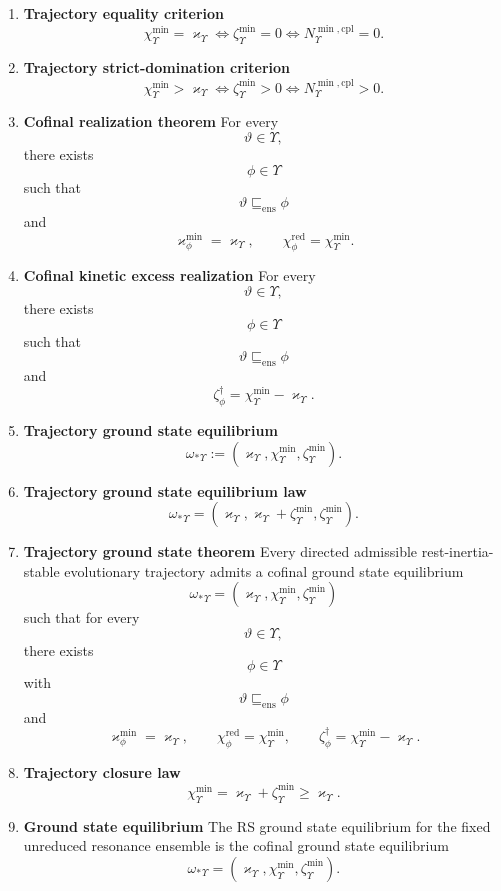 \documentclass[11pt,letterpaper]{article}
\theoremstyle{plain}
\theoremstyle{definition}
\theoremstyle{remark}
\newcommand{\RestInertia}{\varkappa}
\newcommand{\TotInertia}{\chi}
\newcommand{\AccAction}{\zeta}
\newcommand{\ResEnsAlt}{\vartheta}
\newcommand{\EvolTraj}{\Upsilon}
\newcommand{\GroundEq}{{\omega_{\ast}}}
\begin{document}
\begin{enumerate}[resume]
\item \textbf{Trajectory equality criterion}
\[
\TotInertia_{\EvolTraj}^{\min}=\RestInertia_{\EvolTraj}
\iff
\AccAction_{\EvolTraj}^{\min}=0
\iff
N_{\EvolTraj}^{\min, \mathrm{cpl}}=0.
\]

\item \textbf{Trajectory strict-domination criterion}
\[
\TotInertia_{\EvolTraj}^{\min}>\RestInertia_{\EvolTraj}
\iff
\AccAction_{\EvolTraj}^{\min}>0
\iff
N_{\EvolTraj}^{\min, \mathrm{cpl}}>0.
\]

\item \textbf{Cofinal realization theorem}
For every
\[
\ResEnsAlt\in\EvolTraj,
\]
there exists
\[
\phi\in\EvolTraj
\]
such that
\[
\ResEnsAlt\sqsubseteq_{\mathrm{ens}}\phi
\]
and
\[
\RestInertia_{\phi}^{\min}=\RestInertia_{\EvolTraj},
\qquad
\TotInertia_{\phi}^{\mathrm{red}}=\TotInertia_{\EvolTraj}^{\min}.
\]

\item \textbf{Cofinal kinetic excess realization}
For every
\[
\ResEnsAlt\in\EvolTraj,
\]
there exists
\[
\phi\in\EvolTraj
\]
such that
\[
\ResEnsAlt\sqsubseteq_{\mathrm{ens}}\phi
\]
and
\[
\AccAction_{\phi}^{\dagger}
=
\TotInertia_{\EvolTraj}^{\min}-\RestInertia_{\EvolTraj}.
\]

\item \textbf{Trajectory ground state equilibrium}
\[
\GroundEq_{\EvolTraj}
:=
(\RestInertia_{\EvolTraj},\TotInertia_{\EvolTraj}^{\min},\AccAction_{\EvolTraj}^{\min}).
\]

\item \textbf{Trajectory ground state equilibrium law}
\[
\GroundEq_{\EvolTraj}
=
(\RestInertia_{\EvolTraj},\RestInertia_{\EvolTraj}+\AccAction_{\EvolTraj}^{\min},\AccAction_{\EvolTraj}^{\min}).
\]

\item \textbf{Trajectory ground state theorem}
Every directed admissible rest-inertia-stable evolutionary trajectory admits a cofinal ground state equilibrium
\[
\GroundEq_{\EvolTraj}
=
(\RestInertia_{\EvolTraj},\TotInertia_{\EvolTraj}^{\min},\AccAction_{\EvolTraj}^{\min})
\]
such that for every
\[
\ResEnsAlt\in\EvolTraj,
\]
there exists
\[
\phi\in\EvolTraj
\]
with
\[
\ResEnsAlt\sqsubseteq_{\mathrm{ens}}\phi
\]
and
\[
\RestInertia_{\phi}^{\min}=\RestInertia_{\EvolTraj},
\qquad
\TotInertia_{\phi}^{\mathrm{red}}=\TotInertia_{\EvolTraj}^{\min},
\qquad
\AccAction_{\phi}^{\dagger}
=
\TotInertia_{\EvolTraj}^{\min}-\RestInertia_{\EvolTraj}.
\]

\item \textbf{Trajectory closure law}
\[
\TotInertia_{\EvolTraj}^{\min}
=
\RestInertia_{\EvolTraj}
+
\AccAction_{\EvolTraj}^{\min}
\ge
\RestInertia_{\EvolTraj}.
\]

\item \textbf{Ground state equilibrium}
The RS ground state equilibrium for the fixed unreduced resonance ensemble is the cofinal ground state equilibrium
\[
\GroundEq_{\EvolTraj}
=
(\RestInertia_{\EvolTraj},\TotInertia_{\EvolTraj}^{\min},\AccAction_{\EvolTraj}^{\min}).
\]
\end{enumerate}
\end{document}
